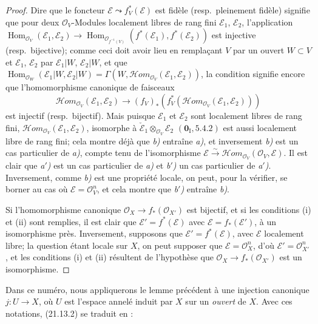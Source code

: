 \begin{proof}
Dire que le foncteur $\mathscr E\leadsto f_V^*(\mathscr E)$ est fidèle
(resp.\ pleinement fidèle) signifie que pour deux $\mathcal O_V$-Modules localement
libres de rang fini $\mathscr E_1$, $\mathscr E_2$, l'application
$\operatorname{Hom}_{\mathcal O_V}(\mathscr E_1,\mathscr E_2)
\longrightarrow
\operatorname{Hom}_{\mathcal O_{f^{-1}(V)}}
(f^*(\mathscr E_1),f^*(\mathscr E_2))$
est injective (resp.\ bijective); comme ceci doit avoir lieu en remplaçant $V$ par un
ouvert $W\subset V$ et $\mathscr E_1$, $\mathscr E_2$ par $\mathscr E_1|W$,
$\mathscr E_2|W$, et que
$\operatorname{Hom}_{\mathcal O_W}(\mathscr E_1|W,\mathscr E_2|W)
=\Gamma(W,\mathscr Hom_{\mathcal O_V}(\mathscr E_1,\mathscr E_2))$,
la condition signifie encore que l'homomorphisme canonique de faisceaux
\[
\label{IV.21.13.2.1}
  \mathscr Hom_{\mathcal O_V}(\mathscr E_1,\mathscr E_2)
  \longrightarrow
  (f_V)_*(f_V^*(\mathscr Hom_{\mathcal O_V}(\mathscr E_1,\mathscr E_2)))
  \tag{21.13.2.1}
\]
est injectif (resp.\ bijectif). Mais puisque $\mathscr E_1$ et $\mathscr E_2$ sont
localement libres de rang fini,
$\mathscr Hom_{\mathcal O_V}(\mathscr E_1,\mathscr E_2)$, isomorphe à
$\check{\mathscr E}_1\otimes_{\mathcal O_V}\mathscr E_2$
$(\mathbf 0_{\mathrm I}, 5.4.2)$ est aussi localement libre de rang fini; cela montre
déjà que \emph{b)} entraîne \emph{a)}, et inversement \emph{b)} est un cas particulier de \emph{a)},
compte tenu de l'isomorphisme
$\mathscr E\xrightarrow{\sim}\mathscr Hom_{\mathcal O_V}(\mathcal O_V,\mathscr E)$.
Il est clair que \emph{a$'$)} est un cas particulier de \emph{a)} et \emph{b$'$)} un cas particulier de
\emph{a$'$)}. Inversement, comme \emph{b)} est une propriété locale, on peut, pour la vérifier,
se borner au cas où $\mathscr E=\mathcal O_V^n$, et cela montre que \emph{b$'$)} entraîne
\emph{b)}.

Si l'homomorphisme canonique $\mathcal O_X\to f_*(\mathcal O_{X'})$ est bijectif,
et si les conditions (i) et (ii) sont remplies, il est clair que
$\mathscr E'=f^*(\mathscr E)$ avec $\mathscr E=f_*(\mathscr E')$, à un isomorphisme
près.
Inversement, supposons que $\mathscr E'=f^*(\mathscr E)$, avec $\mathscr E$ localement
libre; la question étant locale sur $X$, on peut supposer que
$\mathscr E=\mathcal O_X^n$, d'où $\mathscr E'=\mathcal O_{X'}^n$, et les conditions
(i) et (ii) résultent de l'hypothèse que
$\mathcal O_X\to f_*(\mathcal O_{X'})$ est un isomorphisme.
\end{proof}

Dans ce numéro, nous appliquerons le lemme précédent à une injection canonique
$j:U\to X$, où $U$ est l'espace annelé induit par $X$ sur un \emph{ouvert} de $X$.
Avec ces notations, (21.13.2) se traduit en :


